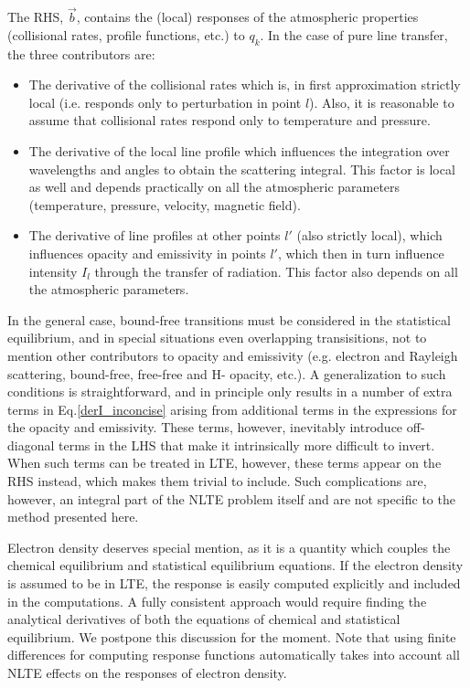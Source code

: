 \documentclass{aa}
\begin{document}
The RHS, $\vec{b}$, contains the (local) responses of the atmospheric properties (collisional rates, profile functions, etc.) to $q_k$. In the case of pure line transfer, the three contributors are:
\begin{itemize}
 \item The derivative of the collisional rates which is, in first approximation strictly local (i.e. responds only to perturbation in point $l$). Also, it is reasonable to assume that collisional rates respond only to temperature and pressure.
 \item The derivative of the local line profile which influences the integration over wavelengths and angles to obtain the scattering integral. This factor is local as well and depends practically on all the atmospheric parameters (temperature, pressure, velocity, magnetic field).
 \item The derivative of line profiles at other points $l'$ (also strictly local), which influences opacity and emissivity in points $l'$, which then in turn influence intensity $I_l$ through the transfer of radiation. This factor also depends on all the atmospheric parameters.
\end{itemize}
In the general case, bound-free transitions must be considered in the statistical equilibrium, and in special situations even overlapping transisitions, not to mention other contributors to opacity and emissivity (e.g. electron and Rayleigh scattering, bound-free, free-free and H- opacity, etc.). A generalization to such conditions is straightforward, and in principle only results in a number of extra terms in Eq.\ref{derI_inconcise} arising from additional terms in the expressions for the opacity and emissivity. These terms, however, inevitably introduce off-diagonal terms in the LHS that make it intrinsically more difficult to invert. When such terms can be treated in LTE, however, these terms appear on the RHS instead, which makes them trivial to include. Such complications are, however, an integral part of the NLTE problem itself and are not specific to the method presented here.

Electron density deserves special mention, as it is a quantity which couples the chemical equilibrium and statistical equilibrium equations. If the electron density is assumed to be in LTE, the response is easily computed explicitly and included in the computations. A fully consistent approach would require finding the analytical derivatives of both the equations of chemical and statistical equilibrium. We postpone this discussion for the moment. Note that using finite differences for computing response functions automatically takes into account all NLTE effects on the responses of electron density.
\end{document}

